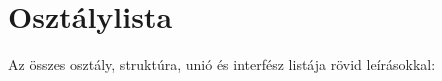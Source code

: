\section{Osztálylista}
Az összes osztály, struktúra, unió és interfész listája rövid leírásokkal\+:\begin{DoxyCompactList}
\item{}
\end{DoxyCompactList}
